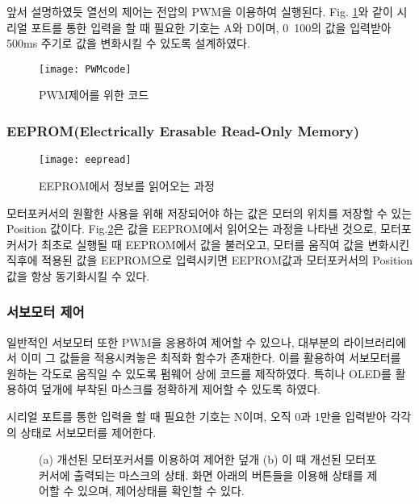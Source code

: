  앞서 설명하였듯 열선의 제어는 전압의 PWM을 이용하여 실행된다. Fig. \ref{PWM}와 같이 시리얼 포트를 통한 입력을 할 때 필요한 기호는 A와 D이며, 0~100의 값을 입력받아 500ms 주기로 값을 변화시킬 수 있도록 설계하였다.
 
  \begin{figure}[ht]
 	\begin{center}
 		\texttt{[image: PWMcode]}
 	\end{center}
 	\caption{PWM제어를 위한 코드}
 	\label{PWM}
 \end{figure}
 
\subsubsection{EEPROM(Electrically Erasable Read-Only Memory)}

 \begin{figure}[ht]
	\begin{center}
		\texttt{[image: eepread]}
	\end{center}
	\caption{EEPROM에서 정보를 읽어오는 과정}
	\label{eepread}
\end{figure}

 모터포커서의 원활한 사용을 위해 저장되어야 하는 값은 모터의 위치를 저장할 수 있는 Position 값이다. Fig.\ref{eepread}은 값을 EEPROM에서 읽어오는 과정을 나타낸 것으로, 모터포커서가 최초로 실행될 때 EEPROM에서 값을 불러오고, 모터를 움직여 값을 변화시킨 직후에 적용된 값을 EEPROM으로 입력시키면 EEPROM값과 모터포커서의 Position 값을 항상 동기화시킬 수 있다.
 
\subsubsection{서보모터 제어}
 일반적인 서보모터 또한 PWM을 응용하여 제어할 수 있으나, 대부분의 라이브러리에서 이미 그 값들을 적용시켜놓은 최적화 함수가 존재한다. 이를 활용하여 서보모터를 원하는 각도로 움직일 수 있도록 펌웨어 상에 코드를 제작하였다. 특히나 OLED를 활용하여 덮개에 부착된 마스크를 정확하게 제어할 수 있도록 하였다.
 
 시리얼 포트를 통한 입력을 할 때 필요한 기호는 N이며, 오직 0과 1만을 입력받아 각각의 상태로 서보모터를 제어한다.

	\begin{figure}[ht]
	\begin{center}
	\end{center}
	\caption{(a) 개선된 모터포커서를 이용하여 제어한 덮개 (b) 이 때 개선된 모터포커서에 출력되는 마스크의 상태. 화면 아래의 버튼들을 이용해 상태를 제어할 수 있으며, 제어상태를 확인할 수 있다.}
\label{mask_status}


\end{figure}

